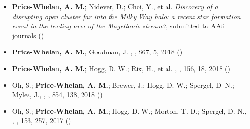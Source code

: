 \documentclass[12pt, letterpaper]{apw-cv}
\begin{document}
	\begin{itemize}

\item {\bf Price-Whelan, A. M.}; Nidever, D.; Choi, Y., et al.
    \textit{Discovery of a disrupting open cluster far into the Milky Way halo: a recent star formation event in the leading arm of the Magellanic stream?},
    submitted to AAS journals ()

\item {\bf Price-Whelan, A. M.}; Goodman, J.
    ,
    \apj, 867, 5, 2018 ()

\item {\bf Price-Whelan, A. M.}; Hogg, D. W.; Rix, H., et al.
    ,
    \apj, 156, 18, 2018 ()

\item Oh, S.; {\bf Price-Whelan, A. M.}; Brewer, J.; Hogg, D. W.; Spergel, D. N.; Myles, J.,
    ,
    \apj, 854, 138, 2018 ()



\item Oh, S.; {\bf Price-Whelan, A. M.}; Hogg, D. W.; Morton, T. D.; Spergel, D. N.,
    ,
    \aj, 153, 257, 2017 ()


\end{itemize}
\end{document}
